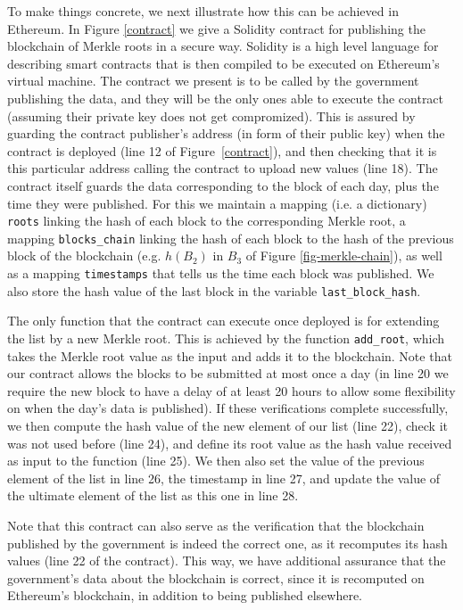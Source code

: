 To make things concrete, we next illustrate how this can be achieved in Ethereum. In Figure \ref{contract} we give a Solidity contract for publishing the blockchain of Merkle roots in a secure way. Solidity \cite{Solidity} is a high level language for describing smart contracts that is then compiled to be executed on Ethereum's virtual machine. The contract we present is to be called by the government publishing the data, and they will be the only ones able to execute the contract (assuming their private key does not get compromized). This is assured by guarding the contract publisher's address (in form of their public key) when the contract is deployed (line 12 of Figure~\ref{contract}), and then checking that it is this particular address calling the contract to upload new values (line 18). The contract itself guards the data corresponding to the block of each day, plus the time they were published. For this we maintain a mapping (i.e. a dictionary) \texttt{roots} linking the hash of each block to the corresponding Merkle root, a mapping \texttt{blocks\_chain} linking the hash of each block to the hash of the previous block of the blockchain (e.g. $h(B_2)$ in $B_3$ of Figure \ref{fig-merkle-chain}), as well as a mapping \texttt{timestamps} that tells us the time each block was published. We also store the hash value of the last block in the variable \texttt{last\_block\_hash}.

The only function that the contract can execute once deployed is for extending the list by a new Merkle root. This is achieved by the function \texttt{add\_root}, which takes the Merkle root value as the input and adds it to the blockchain. Note that our contract allows the blocks to be submitted at most once a day (in line 20 we require the new block to have a delay of at least 20 hours to allow some flexibility on when the day's data is published). If these verifications complete successfully, we then compute the hash value of the new element of our list (line 22), check it was not used before (line 24), and define its root value as the hash value received as input to the function (line 25). We then also set the value of the previous element of the list in line 26, the timestamp in line 27, and update the value of the ultimate element of the list as this one in line 28.

Note that this contract can also serve as the verification that the blockchain published by the government is indeed the correct one, as it recomputes its hash values (line 22 of the contract). This way, we have additional assurance that the government's data about the blockchain is correct, since it is recomputed on Ethereum's blockchain, in addition to being published elsewhere.

